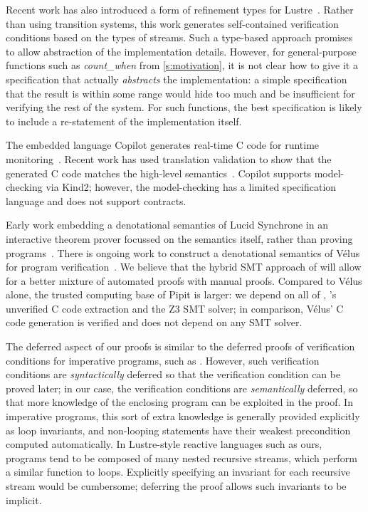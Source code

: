 \documentclass[a4paper,UKenglish,cleveref, autoref, thm-restate,anonymous]{lipics-v2021}
\begin{document}
Recent work has also introduced a form of refinement types for Lustre~\cite{chen2022synchronous}.
Rather than using transition systems, this work generates self-contained verification conditions based on the types of streams.
Such a type-based approach promises to allow abstraction of the implementation details.
However, for general-purpose functions such as \emph{count_when} from \autoref{s:motivation}, it is not clear how to give it a specification that actually \emph{abstracts} the implementation: a simple specification that the result is within some range would hide too much and be insufficient for verifying the rest of the system.
For such functions, the best specification is likely to include a re-statement of the implementation itself.

The embedded language Copilot generates real-time C code for runtime monitoring~\cite{laurent2015assuring}.
Recent work has used translation validation to show that the generated C code matches the high-level semantics~\cite{scott2023trustworthy}.
Copilot supports model-checking via Kind2; however, the model-checking has a limited specification language and does not support contracts.

Early work embedding a denotational semantics of Lucid Synchrone in an interactive theorem prover focussed on the semantics itself, rather than proving programs~\cite{boulme2001clocked}.
There is ongoing work to construct a denotational semantics of Vélus for program verification~\cite{bourke2022towards}.
We believe that the hybrid SMT approach of \fstar{} will allow for a better mixture of automated proofs with manual proofs.
Compared to Vélus alone, the trusted computing base of Pipit is larger: we depend on all of \fstar{}, \lowstar{}'s unverified C code extraction and the Z3 SMT solver; in comparison, Vélus' C code generation is verified and does not depend on any SMT solver.







The deferred aspect of our proofs is similar to the deferred proofs of verification conditions for imperative programs, such as \cite{oconnor2019deferring}.
However, such verification conditions are \emph{syntactically} deferred so that the verification condition can be proved later; in our case, the verification conditions are \emph{semantically} deferred, so that more knowledge of the enclosing program can be exploited in the proof.
In imperative programs, this sort of extra knowledge is generally provided explicitly as loop invariants, and non-looping statements have their weakest precondition computed automatically.
In Lustre-style reactive languages such as ours, programs tend to be composed of many nested recursive streams, which perform a similar function to loops.
Explicitly specifying an invariant for each recursive stream would be cumbersome; deferring the proof allows such invariants to be implicit.
\end{document}
